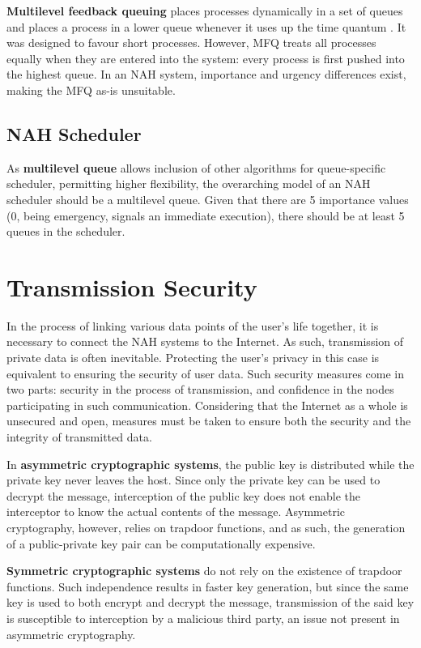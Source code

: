 \documentclass[letterpaper, twocolumn, 10pt, conference]{IEEEtran}
\newcommand{\term}[1]{\textbf{#1}}
\begin{document}
\term{Multilevel feedback queuing} places processes dynamically in a set of queues and places a process in a lower queue whenever it uses up the time quantum \cite{silberschatz1998operating}. It was designed to favour short processes. However, MFQ treats all processes equally when they are entered into the system: every process is first pushed into the highest queue. In an NAH system, importance and urgency differences exist, making the MFQ as-is unsuitable. 

\subsection{NAH Scheduler}

As \term{multilevel queue} allows inclusion of other algorithms for queue-specific scheduler, permitting higher flexibility, the overarching model of an NAH scheduler should be a multilevel queue. Given that there are 5 importance values (0, being emergency, signals an immediate execution), there should be at least 5 queues in the scheduler. 

\section{Transmission Security} \label{sec:transmission_security}

In the process of linking various data points of the user's life together, it is necessary to connect the NAH systems to the Internet. As such, transmission of private data is often inevitable. Protecting the user's privacy in this case is equivalent to ensuring the security of user data. Such security measures come in two parts: security in the process of transmission, and confidence in the nodes participating in such communication. Considering that the Internet as a whole is unsecured and open, measures must be taken to ensure both the security and the integrity of transmitted data. 

In \term{asymmetric cryptographic systems}, the public key is distributed while the private key never leaves the host. Since only the private key can be used to decrypt the message, interception of the public key does not enable the interceptor to know the actual contents of the message. Asymmetric cryptography, however, relies on trapdoor functions, and as such, the generation of a public-private key pair can be computationally expensive.

\term{Symmetric cryptographic systems} do not rely on the existence of trapdoor functions. Such independence results in faster key generation, but since the same key is used to both encrypt and decrypt the message, transmission of the said key is susceptible to interception by a malicious third party, an issue not present in asymmetric cryptography. 
\end{document}
